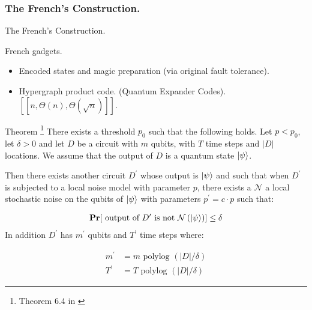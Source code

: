 \documentclass{beamer}
\begin{document}
\begin{frame}
  \frametitle{The French's Construction.
}

  \begin{refsection}
\cite{Tillich_2014} \cite{Leverrier_2015} \cite{grospellier:tel-03364419}
  \printbibliography
\end{refsection}

\end{frame}


\begin{frame}{The French's Construction.}
 \begin{block}{French gadgets.}
   \begin{itemize}
     \item Encoded states and magic preparation (via original fault tolerance).
     \item Hypergraph product code. (Quantum Expander Codes). $\left[ \left[ n, \Theta(n), \Theta(\sqrt{n}) \right] \right]$.
   \end{itemize}
 \end{block}
\end{frame}

\begin{frame}
  \begin{block}{Theorem \footnote{Theorem 6.4 in \cite{grospellier:tel-03364419}}} There exists a threshold $p_{0}$ such that the following holds. Let $p < p_{0}$, let $\delta > 0$ and let $D$ be a circuit with $m$ qubits, with $T$ time steps and $|D|$ locations. We assume that the output of $D$ is a quantum state $\ket{\psi}$. 

    Then there exists another circuit $D^{\prime}$ whose output is $\ket{\psi}$ and such that when $D^{\prime}$ is subjected to a local noise model with parameter $p$, there exists a $\mathcal{N}$ a local stochastic noise on the qubits of $\ket{\psi}$ with parameters $p^{\prime} = c \cdot p$ such that: 

    \begin{equation*}
      \begin{split}
        \mathbf{Pr}[  \text{ output of } D^{\prime} \text { is not } \mathcal{N}\left( \ket{\psi} \right)   ]\le \delta
      \end{split}
    \end{equation*}
    In addition $D^{\prime}$ has $m^{\prime}$ qubits and $T^{\prime}$ time steps where: 

    \begin{equation*}
      \begin{split}
        m^{\prime} &= m \text{ polylog } \left( |D|/\delta \right) \\ 
        T^{\prime} &= T \text{ polylog } \left( |D|/\delta \right) 
      \end{split}
    \end{equation*}
  \end{block}
\end{frame}
\end{document}
